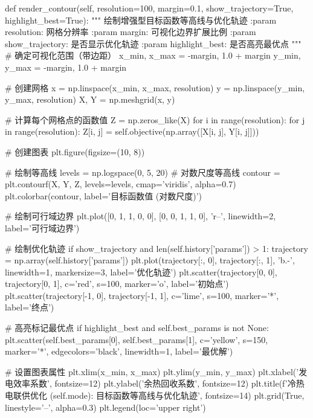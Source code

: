 \documentclass[a4paper,12pt]{article}
\begin{document}
\begin{python}
    def render_contour(self, resolution=100, margin=0.1, show_trajectory=True, highlight_best=True):
        """
        绘制增强型目标函数等高线与优化轨迹
        :param resolution: 网格分辨率
        :param margin: 可视化边界扩展比例
        :param show_trajectory: 是否显示优化轨迹
        :param highlight_best: 是否高亮最优点
        """
        # 确定可视化范围（带边距）
        x_min, x_max = -margin, 1.0 + margin
        y_min, y_max = -margin, 1.0 + margin
        
        # 创建网格
        x = np.linspace(x_min, x_max, resolution)
        y = np.linspace(y_min, y_max, resolution)
        X, Y = np.meshgrid(x, y)
        
        # 计算每个网格点的函数值
        Z = np.zeros_like(X)
        for i in range(resolution):
            for j in range(resolution):
                Z[i, j] = self.objective(np.array([X[i, j], Y[i, j]]))
        
        # 创建图表
        plt.figure(figsize=(10, 8))
        
        # 绘制等高线
        levels = np.logspace(0, 5, 20)  # 对数尺度等高线
        contour = plt.contourf(X, Y, Z, levels=levels, cmap='viridis', alpha=0.7)
        plt.colorbar(contour, label='目标函数值 (对数尺度)')
        
        # 绘制可行域边界
        plt.plot([0, 1, 1, 0, 0], [0, 0, 1, 1, 0], 'r--', linewidth=2, label='可行域边界')
        
        # 绘制优化轨迹
        if show_trajectory and len(self.history['params']) > 1:
            trajectory = np.array(self.history['params'])
            plt.plot(trajectory[:, 0], trajectory[:, 1], 'b.-', linewidth=1, markersize=3, label='优化轨迹')
            plt.scatter(trajectory[0, 0], trajectory[0, 1], c='red', s=100, marker='o', label='初始点')
            plt.scatter(trajectory[-1, 0], trajectory[-1, 1], c='lime', s=100, marker='*', label='终点')
        
        # 高亮标记最优点
        if highlight_best and self.best_params is not None:
            plt.scatter(self.best_params[0], self.best_params[1], c='yellow', s=150, 
                       marker='*', edgecolors='black', linewidth=1, label='最优解')
        
        # 设置图表属性
        plt.xlim(x_min, x_max)
        plt.ylim(y_min, y_max)
        plt.xlabel('发电效率系数', fontsize=12)
        plt.ylabel('余热回收系数', fontsize=12)
        plt.title(f'冷热电联供优化 ({self.mode}): 目标函数等高线与优化轨迹', fontsize=14)
        plt.grid(True, linestyle='--', alpha=0.3)
        plt.legend(loc='upper right')
        

\end{python}
\end{document}
